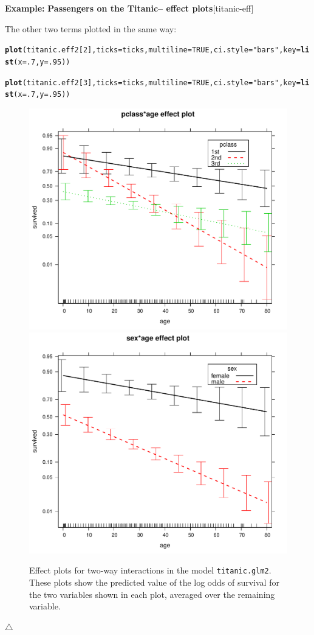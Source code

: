 \documentclass{article}
\makeatletter
\newcommand{\hlnum}[1]{\textcolor[rgb]{0.686,0.059,0.569}{#1}}%
\newcommand{\hlstr}[1]{\textcolor[rgb]{0.192,0.494,0.8}{#1}}%
\newcommand{\hlstd}[1]{\textcolor[rgb]{0.345,0.345,0.345}{#1}}%
\newcommand{\hlkwc}[1]{\textcolor[rgb]{0.333,0.667,0.333}{#1}}%
\newcommand{\hlkwd}[1]{\textcolor[rgb]{0.737,0.353,0.396}{\textbf{#1}}}%
\newenvironment{kframe}{%
 \def\at@end@of@kframe{}%
 \ifinner\ifhmode%
  \def\at@end@of@kframe{\end{minipage}}%
  \begin{minipage}{\columnwidth}%
 \fi\fi%
 \def\FrameCommand##1{\hskip\@totalleftmargin \hskip-\fboxsep
 \colorbox{shadecolor}{##1}\hskip-\fboxsep
     \hskip-\linewidth \hskip-\@totalleftmargin \hskip\columnwidth}%
 \MakeFramed {\advance\hsize-\width
   \@totalleftmargin\z@ \linewidth\hsize
   \@setminipage}}%
 {\par\unskip\endMakeFramed%
 \at@end@of@kframe}
\newenvironment{knitrout}{}{} %
\newenvironment{Example}[2][unnamed-example]%
  {\medskip\noindent\textbf{\textsf{Example:}}
   \textbf{#2}\hfill [#1]\par\smallskip
  }
  {\hfill $\triangle$}
\makeatother
\begin{document}
\begin{Example}[titanic-eff]{Passengers on the Titanic-- effect plots}
The other two terms plotted in the same way:
\begin{knitrout}
\color{fgcolor}\begin{kframe}
\begin{alltt}
\hlkwd{plot}\hlstd{(titanic.eff2[}\hlnum{2}\hlstd{],} \hlkwc{ticks}\hlstd{=ticks,} \hlkwc{multiline}\hlstd{=}\hlnum{TRUE}\hlstd{,} \hlkwc{ci.style}\hlstd{=}\hlstr{"bars"}\hlstd{,} \hlkwc{key}\hlstd{=}\hlkwd{list}\hlstd{(}\hlkwc{x}\hlstd{=}\hlnum{.7}\hlstd{,} \hlkwc{y}\hlstd{=}\hlnum{.95}\hlstd{))}
\end{alltt}
\end{kframe}
\end{knitrout}

\begin{knitrout}
\color{fgcolor}\begin{kframe}
\begin{alltt}
\hlkwd{plot}\hlstd{(titanic.eff2[}\hlnum{3}\hlstd{],} \hlkwc{ticks}\hlstd{=ticks,} \hlkwc{multiline}\hlstd{=}\hlnum{TRUE}\hlstd{,} \hlkwc{ci.style}\hlstd{=}\hlstr{"bars"}\hlstd{,} \hlkwc{key}\hlstd{=}\hlkwd{list}\hlstd{(}\hlkwc{x}\hlstd{=}\hlnum{.7}\hlstd{,} \hlkwc{y}\hlstd{=}\hlnum{.95}\hlstd{))}
\end{alltt}
\end{kframe}
\end{knitrout}


\begin{figure}[htb!]
\includegraphics[width = .49\linewidth]{figure/titanic-eff2-2}
\includegraphics[width = .49\linewidth]{figure/titanic-eff2-3}
\caption{Effect plots for two-way interactions in the model \texttt{titanic.glm2}.
These plots show the predicted value of the log odds of survival for the two
variables shown in each plot, averaged over the remaining variable.}
\label{fig:titanic-eff2-23}
\end{figure}


\end{Example}
\end{document}
